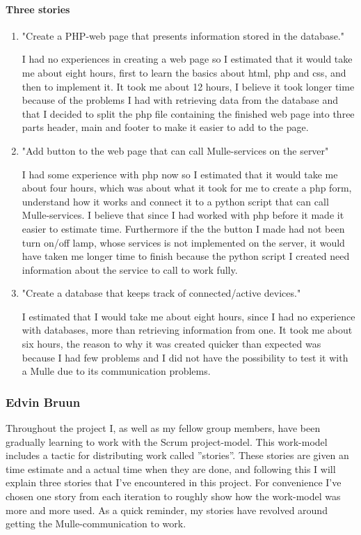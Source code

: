 \paragraph{Three stories}
\begin{enumerate}
\item{"Create a PHP-web page that presents information stored in the database."}

I had no experiences in creating a web page so I estimated that it would take me about eight hours, first to learn the basics about html, php and css, and then to implement it. It took me
about 12 hours, I believe it took longer time because of the problems I had with retrieving data from the database and that I decided to split the php file containing the finished web page
into three parts header, main and footer to make it easier to add to the page. 

\item {"Add button to the web page that can call Mulle-services on the server"}

I had some experience with php now so I estimated that it would take me about four hours, which was about what it took for me to create a php form, understand how it works and connect it to a
python script that can call Mulle-services. I believe that since I had worked with php before it made it easier to estimate time. Furthermore if the the button I made had not been turn on/off
lamp, whose services is not implemented on the server, it would have taken me longer time to finish because the python script I created need information about the service to call to work
fully. 

\item {"Create a database that keeps track of connected/active devices."}

I estimated that I would take me about eight hours, since I had no experience with databases, more than retrieving information from one. It took me about six hours, the reason to why it was
created quicker than expected was because I had few problems and I did not have the possibility to test it with a Mulle due to its communication problems.
 
\end{enumerate}	
\subsubsection{Edvin Bruun}
Throughout the project I, as well as my fellow group members, have been gradually learning to work with the Scrum project-model.
This work-model includes a tactic for distributing work called ''stories''. These stories are given an time estimate and a actual time when they are done, 
and following this I will explain three stories that I've encountered in this project. 
For convenience I've chosen one story from each iteration to roughly show how the work-model was more and more used. As a quick reminder, my stories have revolved around getting the Mulle-communication to work.


